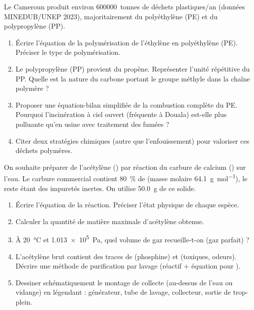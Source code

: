 \documentclass[11pt]{article}
\begin{document}
\begin{exercice}
Le Cameroun produit environ \SI{600000}{tonnes} de déchets plastiques/an (données MINEDUB/UNEP 2023), majoritairement du polyéthylène (PE) et du polypropylène (PP).
\begin{enumerate}
    \item Écrire l'équation de la polymérisation de l'éthylène en polyéthylène (PE). Préciser le type de polymérisation.
    \item Le polypropylène (PP) provient du propène. Représenter l'unité répétitive du PP. Quelle est la nature du carbone portant le groupe méthyle dans la chaîne polymère ?
    \item Proposer une équation-bilan simplifiée de la combustion complète du PE. Pourquoi l'incinération à ciel ouvert (fréquente à Douala) est-elle plus polluante qu'en usine avec traitement des fumées ?
    \item Citer deux stratégies chimiques (autre que l'enfouissement) pour valoriser ces déchets polymères.
\end{enumerate}
\end{exercice}

\begin{exercice}
On souhaite préparer de l'acétylène () par réaction du carbure de calcium () sur l'eau. Le carbure commercial contient \SI{80}{\%} de  (masse molaire \SI{64,1}{g.mol^{-1}}), le reste étant des impuretés inertes. On utilise \SI{50,0}{g} de ce solide.
\begin{enumerate}
    \item Écrire l'équation de la réaction. Préciser l'état physique de chaque espèce.
    \item Calculer la quantité de matière maximale d'acétylène obtenue.
    \item À \SI{20}{\celsius} et \SI{1,013e5}{Pa}, quel volume de gaz recueille-t-on (gaz parfait) ?
    \item L'acétylène brut contient des traces de  (phosphine) et  (toxiques, odeurs). Décrire une méthode de purification par lavage (réactif + équation pour ).
    \item Dessiner schématiquement le montage de collecte (au-dessus de l'eau ou vidange) en légendant : générateur, tube de lavage, collecteur, sortie de trop-plein.
\end{enumerate}
\end{exercice}
\end{document}

